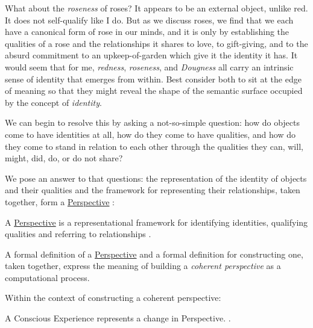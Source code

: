 \documentclass[runningheads]{llncs}
\newcommand{\link}[2]{%
\href{#1}{\textcolor{wikiblue}{#2}\xspace}%
}
\newcommand{\repo}[2]{%
\link{https://github.com/DNA-Platform/inexplicable-phenomena/blob/main/#1}{#2}\xspace%
}
\newcommand{\Perspective}[0]{%
\repo{research/consciousness/a-novel-perspective-on-vision.md}{Perspective}%
}
\begin{document}
What about the \emph{roseness} of roses? It appears to be an external object, unlike red. It does not self-qualify like I do. But as we discuss roses, we find that we each have a canonical form of rose in our minds, and it is only by establishing the qualities of a rose and the relationships it shares to love, to gift-giving, and to the absurd commitment to an upkeep-of-garden which give it the identity it has. It would seem that for me, \emph{redness}, \emph{roseness}, and \emph{Dougness} all carry an intrinsic sense of identity that emerges from within. Best consider both to sit at the edge of meaning so that they might reveal the shape of the semantic surface occupied by the concept of \emph{identity}.

We can begin to resolve this by asking a not-so-simple question: how do objects come to have identities at all, how do they come to have qualities, and how do they come to stand in relation to each other through the qualities they can, will, might, did, do, or do not share? 

We pose an answer to that questions: the representation of the identity of objects and their qualities and the framework for representing their relationships, taken together, form a \Perspective:

\begin{assertion}
	\begin{sloppypar}
		A \Perspective is a representational framework for identifying identities, qualifying qualities and referring to relationships \cite{Formalism}.
	\end{sloppypar}
\end{assertion}

A formal definition of a \Perspective and a formal definition for constructing one, taken together, express the meaning of building a \emph{coherent perspective} as a computational process.

Within the context of constructing a coherent perspective:

\begin{assertion}
	A Conscious Experience represents a change in Perspective. \cite{Formalism}.
\end{assertion}
\end{document}
